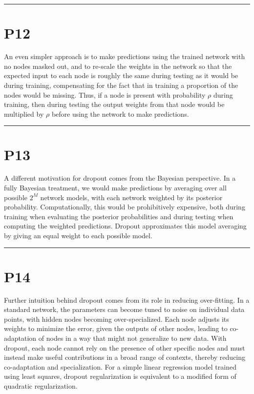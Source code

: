 \documentclass{article}
\begin{document}
\noindent\rule{\linewidth}{0.4pt}

\section{P12}

An even simpler approach is to make predictions using the trained network with no nodes masked out, and to re-scale the weights in the network so that the expected input to each node is roughly the same during testing as it would be during training, compensating for the fact that in training a proportion of the nodes would be missing. Thus, if a node is present with probability $\rho$ during training, then during testing the output weights from that node would be multiplied by $\rho$ before using the network to make predictions.

\noindent\rule{\linewidth}{0.4pt}

\section{P13}

A different motivation for dropout comes from the Bayesian perspective. In a fully Bayesian treatment, we would make predictions by averaging over all possible $2^M$ network models, with each network weighted by its posterior probability. Computationally, this would be prohibitively expensive, both during training when evaluating the posterior probabilities and during testing when computing the weighted predictions. Dropout approximates this model averaging by giving an equal weight to each possible model.

\noindent\rule{\linewidth}{0.4pt}

\section{P14}

Further intuition behind dropout comes from its role in reducing over-fitting. In a standard network, the parameters can become tuned to noise on individual data points, with hidden nodes becoming over-specialized. Each node adjusts its weights to minimize the error, given the outputs of other nodes, leading to co-adaptation of nodes in a way that might not generalize to new data. With dropout, each node cannot rely on the presence of other specific nodes and must instead make useful contributions in a broad range of contexts, thereby reducing co-adaptation and specialization. For a simple linear regression model trained using least squares, dropout regularization is equivalent to a modified form of quadratic regularization.
\end{document}
